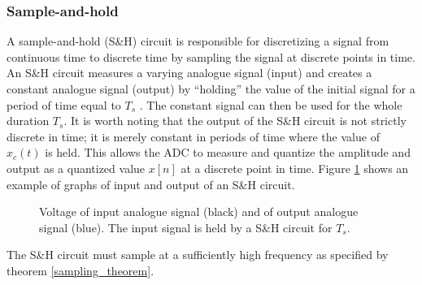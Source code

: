 \subsubsection{Sample-and-hold}
A sample-and-hold (S\&H) circuit is responsible for discretizing a signal from continuous time to discrete time by sampling the signal at discrete points in time. An S\&H circuit measures a varying analogue signal (input) and creates a constant analogue signal (output) by ``holding'' the value of the initial signal for a period of time equal to $T_s$ \cite{pelgrom}. The constant signal can then be used for the whole duration $T_s$. It is worth noting that the output of the S\&H circuit is not strictly discrete in time; it is merely constant in periods of time where the value of $x_c(t)$ is held. This allows the ADC to measure and quantize the amplitude and output as a quantized value $x[n]$ at a discrete point in time. Figure \ref{fig:S/H} shows an example of graphs of input and output of an S\&H circuit.
\begin{figure}[H]
\centering
{}
\caption{Voltage of input analogue signal (black) and of output analogue signal (blue). The input signal is held by a S\&H circuit for $T_s$.}
\label{fig:S/H}
\end{figure}
The S\&H circuit must sample at a sufficiently high frequency as specified by theorem \ref{sampling_theorem}.

